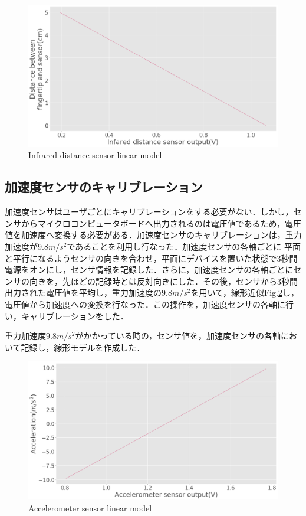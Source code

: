 \begin{figure}[H]
  \centering
  \includegraphics[width=0.8\linewidth]{fig/infrared_linearmodel}
  \caption{Infrared distance sensor linear model }
  \label{fig:cali_inf} 
\end{figure}

\subsection*{加速度センサのキャリブレーション}
加速度センサはユーザごとにキャリブレーションをする必要がない．しかし，センサからマイクロコンピュータボードへ出力されるのは電圧値であるため，電圧値を加速度へ変換する必要がある．加速度センサのキャリブレーションは，重力加速度が$9.8m/s^2$であることを利用し行なった．加速度センサの各軸ごとに
平面と平行になるようセンサの向きを合わせ，平面にデバイスを置いた状態で3秒間電源をオンにし，センサ情報を記録した．さらに，加速度センサの各軸ごとにセンサの向きを，先ほどの記録時とは反対向きにした．その後，センサから3秒間出力された電圧値を平均し，重力加速度の$9.8m/s^2$を用いて，線形近似Fig.\ref{fig:cali_accel}し，電圧値から加速度への変換を行なった．この操作を，加速度センサの各軸に行い，キャリブレーションをした．

重力加速度$9.8m/s^2$がかかっている時の，センサ値を，加速度センサの各軸において記録し，線形モデルを作成した．

\begin{figure}[H]
  \centering
  \includegraphics[width=0.8\linewidth]{fig/accel_linearmodel}
  \caption{Accelerometer sensor linear model }
  \label{fig:cali_accel}
\end{figure}


